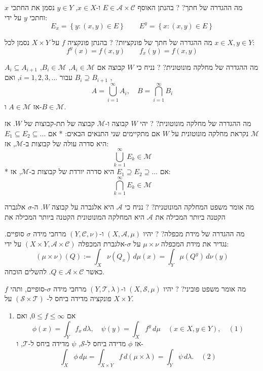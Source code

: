 \documentclass{tstextbook}
\begin{document}
מה ההגדרה של חתך?
?
בהנתן האוסף \(E \in \mathcal{A}\times \mathcal{ C}\) ו-\(x \in X\), \(y \in Y\) נסמן את החתכי \(x\) וחתכי \(y\) על ידי:
$$E_{x}=\left\{ y:(x,y)\in E \right\}\qquad E^{y}=\left\{ x:(x,y)\in E \right\}$$

מה ההגדרה של חתך של פונקציות?
?
בהנתן פונקציה \(f\) על \(X \times Y\) נסמן לכל \(x \in X, y \in Y\):
$$f^{y}(x)=f(x,y)\qquad f_{x}(y)=f(x,y)$$

מה ההגדרה של מחלקה מונוטונית?
?
נניח כי \(W\) קבוצה
אם \(A_i \in \mathcal{M}\), \(B_i \in \mathcal{M}\), \(A_i \subseteq A_{i+1}\), \(B_i \supseteq B_{i+1}\) עבור \(i = 1, 2, 3, ...\), ואם
$$A = \bigcup_{i=1}^\infty A_i, \quad B = \bigcap_{i=1}^\infty B_i$$
אז \(A \in \mathcal{M}\) ו-\(B \in \mathcal{M}\).

מה ההגדרה של מחלקה מונוטונית?
?
יהי \(W\) קבוצה ו-\(\mathcal{M}\) קבוצה של תת-קבוצות של \(W\). אז \(\mathcal{M}\) נקראת מחלקה מונוטונית על \(W\) אם מתקיימים שני התנאים הבאים:
*   אם \(E_1 \subseteq E_2 \subseteq \dots\) היא סדרה עולה של קבוצות ב-\(\mathcal{M}\), אז:
$$\bigcup_{k=1}^{\infty} E_k \in \mathcal{M}$$
*   אם \(E_1 \supseteq E_2 \supseteq \dots\) היא סדרה יורדת של קבוצות ב-\(\mathcal{M}\), אז:
$$\bigcap_{k=1}^{\infty} E_k \in \mathcal{M}$$

מה אומר משפט המחלקה המונוטנית?
?
נניח כי \(\mathcal{A}\) היא אלגברה על קבוצה \(W\). ה-\(\sigma\) אלגברה הקטנה ביותר המכילה את \(\mathcal{A}\) היא המחלקה המונוטונית הקטנה ביותר המכילה את

מה ההגדרה של מידת מכפלה?
?
יהיו \((X, \mathcal{A}, \mu)\) ו-\((Y, \mathcal{C}, \nu)\) מרחבי מידה \(\sigma\) סופיים. נגדיר את מידת המכפלה \(\mu \times \nu\) על \(\sigma\)-אלגברת המכפלה \(\left( X\times Y,\mathcal{A} \times \mathcal{C} \right)\) על ידי:
$$(\mu \times \nu)(Q) := \int_X \nu(Q_x) \, d\mu(x) = \int_Y \mu(Q^y) \, d\nu(y)$$
כאשר \(Q \in \mathcal{A} \times \mathcal{C}\).
להשלים הוכחה.

מה אומר משפט פוביני?
?
יהיו \((X, \mathcal{S}, \mu)\) ו-\((Y, \mathcal{T}, \lambda)\) מרחבי מידה \(\sigma\)-סופיים, ותהי \(f\) פונקציה מדידה ביחס ל- \((\mathcal{S} \times \mathcal{T})\) על \(X \times Y\).

\begin{enumerate}
  \item אם \(0 \le f \le \infty\), ואם 
$$\phi(x) = \int_Y f_x \, d\lambda, \quad \psi(y) = \int_X f^y \, d\mu \quad (x \in X, y \in Y), \quad (1)$$
אז \(\phi\) מדידה ביחס ל-\(\mathcal{S}\), \(\psi\) מדידה ביחס ל-\(\mathcal{T}\), ו-
$$\int_X \phi \, d\mu = \int_{X \times Y} f \, d(\mu \times \lambda) = \int_Y \psi \, d\lambda. \quad (2)$$
\end{enumerate}
\end{document}
